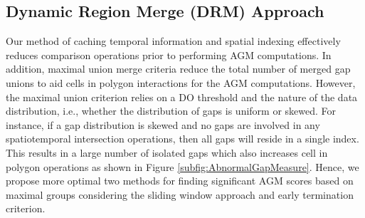 \documentclass[acmsmall]{acmart}
\begin{document}

\subsection{Dynamic Region Merge (DRM) Approach}
\label{subsection:DRM}
Our method of caching temporal information and spatial indexing effectively reduces comparison operations prior to performing AGM computations. In addition, maximal union merge criteria reduce the total number of merged gap unions to aid cells in polygon interactions for the AGM computations. However, the maximal union criterion relies on a DO threshold and the nature of the data distribution, i.e., whether the distribution of gaps is uniform or skewed. For instance, if a gap distribution is skewed and no gaps are involved in any spatiotemporal intersection operations, then all gaps will reside in a single index. This results in a large number of isolated gaps which also increases cell in polygon operations as shown in Figure \ref{subfig:AbnormalGapMeasure}. Hence, we propose more optimal two methods for finding significant AGM scores based on maximal groups considering the sliding window approach and early termination criterion.
\end{document}
